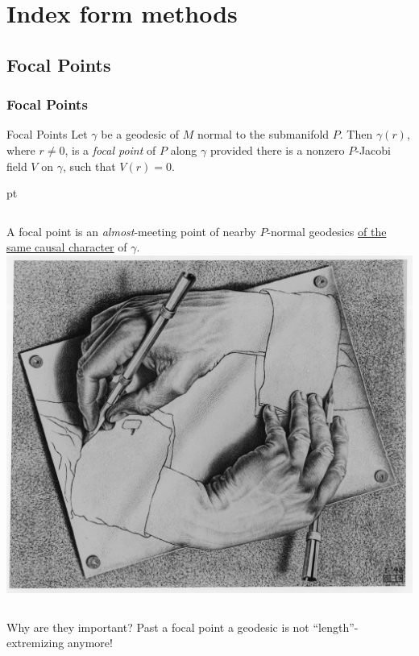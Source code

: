 \documentclass[handout]{beamer}
\begin{document}
	\section{Index form methods}
	\subsection{Focal Points}
	\begin{frame}
		\frametitle{Focal Points}
		\begin{defblock}{Focal Points}
			Let \(\gamma\) be a geodesic of \(M\) normal to the submanifold \(P\). Then \(\gamma(r)\), where \(r \neq 0\), is a \emph{focal point} of \(P\) along \(\gamma\) provided there is a nonzero \(P\)-Jacobi field \(V\) on \(\gamma\), such that \(V(r) = 0\).
		\end{defblock}
		 pt
		\begin{columns}
			A focal point is an \emph{almost}-meeting point of nearby \(P\)-normal geodesics \underline{of the same causal character} of \(\gamma\).
			\centering
			\includegraphics[scale=0.15]{Immagini/escher.jpg}
		\end{columns}

		\begin{ideablock}{Why are they important?}
			\centering
			Past a focal point a geodesic is not ``length''-extremizing anymore!
		\end{ideablock}
	\end{frame}
\end{document}
